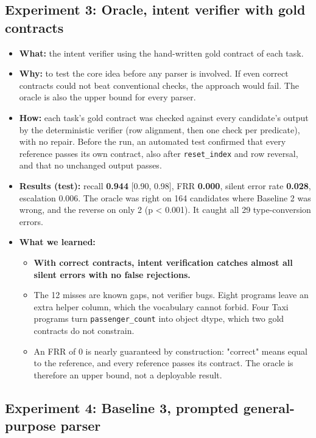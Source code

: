 \documentclass[11pt]{article}
\providecommand{\tightlist}{\setlength{\itemsep}{0pt}\setlength{\parskip}{0pt}}
\begin{document}
\subsection{Experiment 3: Oracle, intent verifier with gold contracts}

\begin{itemize}
\tightlist
\item
  \textbf{What:} the intent verifier using the hand-written gold
  contract of each task.
\item
  \textbf{Why:} to test the core idea before any parser is involved. If
  even correct contracts could not beat conventional checks, the
  approach would fail. The oracle is also the upper bound for every
  parser.
\item
  \textbf{How:} each task's gold contract was checked against every
  candidate's output by the deterministic verifier (row alignment, then
  one check per predicate), with no repair. Before the run, an automated
  test confirmed that every reference passes its own contract, also
  after \texttt{reset\_\allowbreak{}index} and row reversal, and that no
  unchanged output passes.
\item
  \textbf{Results (test):} recall \textbf{0.944} {[}0.90, 0.98{]}, FRR
  \textbf{0.000}, silent error rate \textbf{0.028}, escalation 0.006.
  The oracle was right on 164 candidates where Baseline 2 was wrong, and
  the reverse on only 2 (p \textless{} 0.001). It caught all 29
  type-conversion errors.
\item
  \textbf{What we learned:}

  \begin{itemize}
  \tightlist
  \item
    \textbf{With correct contracts, intent verification catches almost
    all silent errors with no false rejections.}
  \item
    The 12 misses are known gaps, not verifier bugs. Eight programs
    leave an extra helper column, which the vocabulary cannot forbid.
    Four Taxi programs turn \texttt{passenger\_\allowbreak{}count} into
    object dtype, which two gold contracts do not constrain.
  \item
    An FRR of 0 is nearly guaranteed by construction: "correct" means
    equal to the reference, and every reference passes its contract. The
    oracle is therefore an upper bound, not a deployable result.
  \end{itemize}
\end{itemize}

\subsection{Experiment 4: Baseline 3, prompted general-purpose parser}
\end{document}
